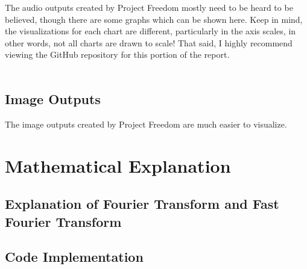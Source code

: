\documentclass[notitlepage]{article}
\begin{document}
The audio outputs created by Project Freedom mostly need to be heard to be
believed, though there are some graphs which can be shown here. Keep in mind,
the visualizations for each chart are different, particularly in the
axis scales, in other words, not all charts are drawn to scale! That said,
I highly recommend viewing the GitHub repository for this portion of the
report.
\\\\


\subsection{Image Outputs}

The image outputs created by Project Freedom are much easier to visualize.



\section{Mathematical Explanation}

\subsection{Explanation of Fourier Transform and Fast Fourier Transform}

\subsection{Code Implementation}
\end{document}
